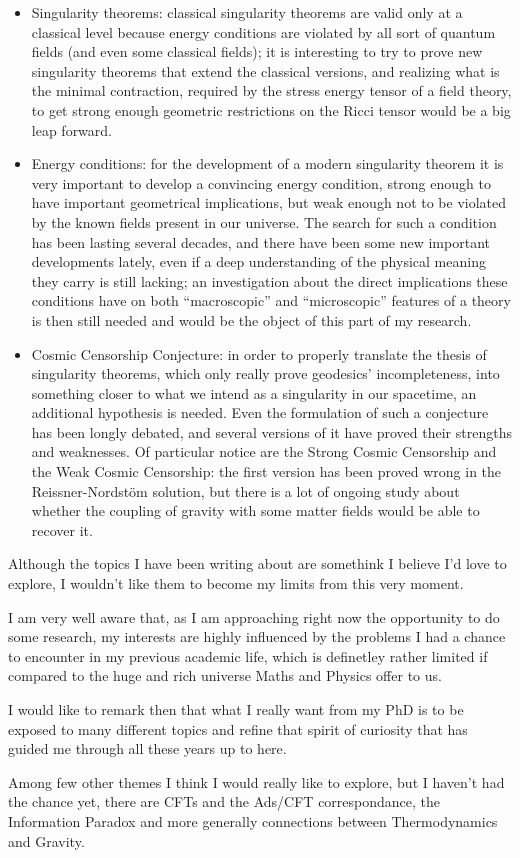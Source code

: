 \documentclass[12pt, a4paper]{article}
\begin{document}
\begin{itemize}
	\item Singularity theorems: classical singularity theorems are valid only at a classical level because energy conditions are violated by all sort of quantum fields (and even some classical fields); it is interesting to try to prove new singularity theorems that extend the classical versions, and realizing what is the minimal contraction, required by the stress energy tensor of a field theory, to get strong enough geometric restrictions on the Ricci tensor would be a big leap forward.
	\item Energy conditions: for the development of a modern singularity theorem it is very important to develop a convincing energy condition, strong enough to have important geometrical implications, but weak enough not to be violated by the known fields present in our universe. The search for such a condition has been lasting several decades, and there have been some new important developments lately, even if a deep understanding of the physical meaning they carry is still lacking; an investigation about the direct implications these conditions have on both ``macroscopic'' and ``microscopic'' features of a theory is then still needed and would be the object of this part of my research.
	\item Cosmic Censorship Conjecture: in order to properly translate the thesis of singularity theorems, which only really prove geodesics' incompleteness, into something closer to what we intend as a singularity in our spacetime, an additional hypothesis is needed. Even the formulation of such a conjecture has been longly debated, and several versions of it have proved their strengths and weaknesses. Of particular notice are the Strong Cosmic Censorship and the Weak Cosmic Censorship: the first version has been proved wrong in the Reissner-Nordst\"om solution, but there is a lot of ongoing study about whether the coupling of gravity with some matter fields would be able to recover it. 
\end{itemize}

Although the topics I have been writing about are somethink I believe I'd love to explore, I wouldn't like them to become my limits from this very moment.

I am very well aware that, as I am approaching right now the opportunity to do some research, my interests are highly influenced by the problems I had a chance to encounter in my previous academic life, which is definetley rather limited if compared to the huge and rich universe Maths and Physics offer to us.

I would like to remark then that what I really want from my PhD is to be exposed to many different topics and refine that spirit of curiosity that has guided me through all these years up to here.

Among few other themes I think I would really like to explore, but I haven't had the chance yet, there are CFTs and the Ads/CFT correspondance, the Information Paradox and more generally connections between Thermodynamics and Gravity.
\end{document}
